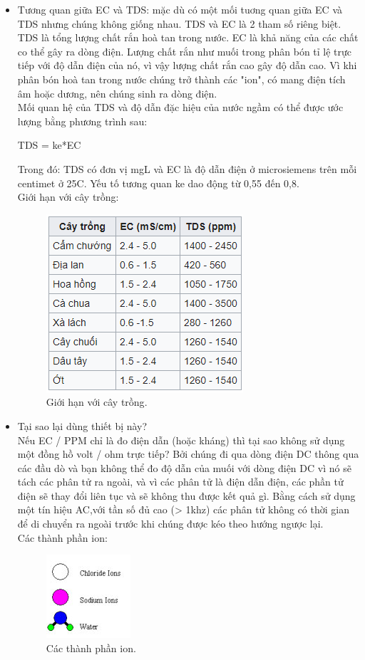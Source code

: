 \documentclass[a4paper,12pt,oneside]{article}
\begin{document}
\begin{itemize}
\item Tương quan giữa EC và TDS: mặc dù có một mối tuơng quan giữa EC và TDS nhưng chúng không giống nhau. TDS và EC là 2 tham số riêng biệt. TDS là tổng lượng chất rắn hoà tan trong nước. EC là khả năng của các chất co thể gây ra dòng điện. Lượng chất rắn như muối trong phân bón tỉ lệ trực tiếp với độ dẫn điện của nó, vì vậy lượng chất rắn cao gây độ dẫn cao. Vì khi phân bón hoà tan trong nước chúng trở thành các "ion", có mang điện tích âm hoặc dương, nên chúng sinh ra dòng điện.\\
Mối quan hệ của TDS và độ dẫn đặc hiệu của nước ngầm có thể được ước lượng bằng phương trình sau:
\begin{center}
		TDS = ke*EC
\end{center}					
Trong đó: TDS có đơn vị mg\/L và EC là độ dẫn điện ở microsiemens trên mỗi centimet ở 25\textdegree{}C. Yếu tố tương quan ke dao động từ 0,55 đến 0,8.\\
Giới hạn với cây trồng:
\begin{figure}[H]
	\centering
	\includegraphics[scale=.8]{hinh/PPM/ppm_thamkhao.PNG}
	\caption{Giới hạn với cây trồng\cite{ec}.}
	\label{fig:ppm_thamkhao}
\end{figure}

\item Tại sao lại dùng thiết bị này?\\
Nếu EC / PPM chỉ là đo điện dẫn (hoặc kháng) thì tại sao không sử dụng một đồng hồ volt / ohm trực tiếp? Bởi chúng đi qua dòng điện DC thông qua các đầu dò và bạn không thể đo độ dẫn của muối với dòng điện DC vì nó sẽ tách các phân tử ra ngoài, và vì các phân tử là điện dẫn điện, các phần tử điện sẽ thay đổi liên tục và sẽ không thu được kết quả gì. Bằng cách sử dụng một tín hiệu AC,với tần số đủ cao (> 1khz) các phân tử không có thời gian để di chuyển ra ngoài trước khi chúng được kéo theo hướng ngược lại.\\
Các thành phần ion:
\begin{figure}[H]
	\centering
	\includegraphics[scale=1]{hinh/PPM/ppm_ion.png}
	\caption{Các thành phần ion\cite{ppm}.}
	\label{fig:/ppm_ion}
\end{figure}


\end{itemize}
\end{document}

